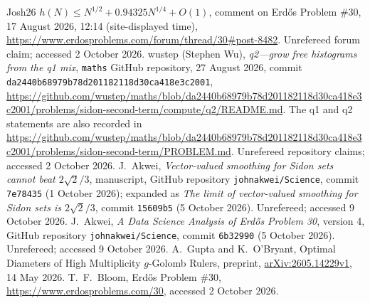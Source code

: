 \documentclass[10pt]{article}
\numberwithin{equation}{section}
\theoremstyle{remark}
\begin{document}
\begin{thebibliography}{Josh26}
$h(N)\le N^{1/2}+0.94325N^{1/4}+O(1)$,
comment on Erd\H{o}s Problem \#30, 17 August 2026, 12:14 (site-displayed time),
\url{https://www.erdosproblems.com/forum/thread/30#post-8482}.
Unrefereed forum claim; accessed 2 October 2026.
 wustep (Stephen Wu), \emph{q2---grow free histograms from the q1 mix},
\texttt{maths} GitHub repository, 27 August 2026,
commit \texttt{da2440b68979b78d201182118d30ca418e3c2001},
\url{https://github.com/wustep/maths/blob/da2440b68979b78d201182118d30ca418e3c2001/problems/sidon-second-term/compute/q2/README.md}.
The q1 and q2 statements are also recorded in
\url{https://github.com/wustep/maths/blob/da2440b68979b78d201182118d30ca418e3c2001/problems/sidon-second-term/PROBLEM.md}.
Unrefereed repository claims; accessed 2 October 2026.
 J.~Akwei, \emph{Vector-valued smoothing for Sidon sets cannot beat $2\sqrt2/3$}, manuscript,
GitHub repository \texttt{johnakwei/Science}, commit \texttt{7e78435} (1 October 2026); expanded as
\emph{The limit of vector-valued smoothing for Sidon sets is $2\sqrt2/3$}, commit \texttt{15609b5} (5 October 2026).
Unrefereed; accessed 9 October 2026.
 J.~Akwei, \emph{A Data Science Analysis of Erd\H{o}s Problem 30}, version 4,
GitHub repository \texttt{johnakwei/Science}, commit \texttt{6b32990} (5 October 2026).
Unrefereed; accessed 9 October 2026.
 A.~Gupta and K.~O'Bryant, Optimal Diameters of High Multiplicity $g$-Golomb Rulers,
preprint, \href{https://arxiv.org/abs/2605.14229v1}{arXiv:2605.14229v1},
14 May 2026.
 T.~F.~Bloom, Erd\H{o}s Problem \#30,
\url{https://www.erdosproblems.com/30}, accessed 2 October 2026.
\end{thebibliography}
\end{document}
